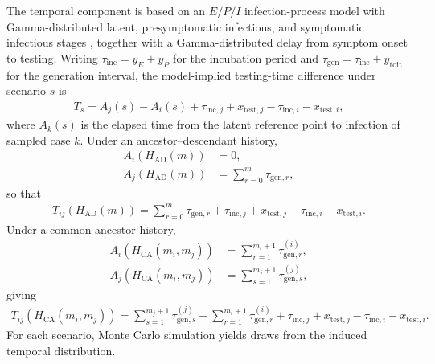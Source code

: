 \documentclass[10pt,a4paper]{article}
\begin{document}
The temporal component is based on an $E/P/I$ infection-process model with Gamma-distributed latent, presymptomatic infectious, and symptomatic infectious stages \citep{Hart2021}, together with a Gamma-distributed delay from symptom onset to testing. Writing $\tau_{\mathrm{inc}} = y_E + y_P$ for the incubation period and $\tau_{\mathrm{gen}} = \tau_{\mathrm{inc}} + y_{\mathrm{toit}}$ for the generation interval, the model-implied testing-time difference under scenario $s$ is
\begin{align}
T_s
=
A_j(s) - A_i(s)
+
\tau_{\mathrm{inc},j} + x_{\mathrm{test},j}
-
\tau_{\mathrm{inc},i} - x_{\mathrm{test},i},
\end{align}
where $A_k(s)$ is the elapsed time from the latent reference point to infection of sampled case $k$. Under an ancestor--descendant history,
\begin{align}
A_i\!\left(H_{\mathrm{AD}}(m)\right) &= 0,\\
A_j\!\left(H_{\mathrm{AD}}(m)\right) &= \sum_{r=0}^{m}\tau_{\mathrm{gen},r},
\end{align}
so that
\begin{align}
T_{ij}\!\left(H_{\mathrm{AD}}(m)\right)
=
\sum_{r=0}^{m}\tau_{\mathrm{gen},r}
+
\tau_{\mathrm{inc},j} + x_{\mathrm{test},j}
-
\tau_{\mathrm{inc},i} - x_{\mathrm{test},i}.
\end{align}
Under a common-ancestor history,
\begin{align}
A_i\!\left(H_{\mathrm{CA}}(m_i,m_j)\right)
&=
\sum_{r=1}^{m_i+1}\tau_{\mathrm{gen},r}^{(i)},\\
A_j\!\left(H_{\mathrm{CA}}(m_i,m_j)\right)
&=
\sum_{s=1}^{m_j+1}\tau_{\mathrm{gen},s}^{(j)},
\end{align}
giving
\begin{align}
T_{ij}\!\left(H_{\mathrm{CA}}(m_i,m_j)\right)
=
\sum_{s=1}^{m_j+1}\tau_{\mathrm{gen},s}^{(j)}
-
\sum_{r=1}^{m_i+1}\tau_{\mathrm{gen},r}^{(i)}
+
\tau_{\mathrm{inc},j} + x_{\mathrm{test},j}
-
\tau_{\mathrm{inc},i} - x_{\mathrm{test},i}.
\end{align}
For each scenario, Monte Carlo simulation yields draws from the induced temporal distribution.
\end{document}
